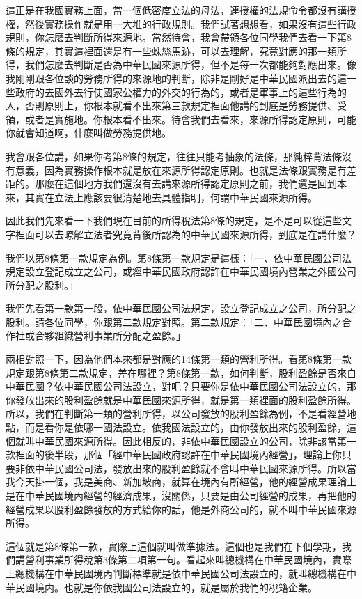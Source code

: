 \documentclass[]{ctexbook}
\begin{document}
這正是在我國實務上面，當一個低密度立法的母法，連授權的法規命令都沒有講授權，然後實務操作就是用一大堆的行政規則。我們試著想想看，如果沒有這些行政規則，你怎麼去判斷所得來源地。當然待會，我會帶領各位同學我們去看一下第8條的規定，其實這裡面還是有一些蛛絲馬跡，可以去理解，究竟對應的那一類所得，我們怎麼去判斷是否為中華民國來源所得，但不是每一次都能夠對應出來。像我剛剛跟各位談的勞務所得的來源地的判斷，除非是剛好是中華民國派出去的這一些政府的去國外去行使國家公權力的外交的行為的，或者是軍事上的這些行為的人，否則原則上，你根本就看不出來第三款規定裡面他講的到底是勞務提供、受領，或者是實施地。你根本看不出來。待會我們去看來，來源所得認定原則，可能你就會知道啊，什麼叫做勞務提供地。

我會跟各位講，如果你考第8條的規定，往往只能考抽象的法條，那純粹背法條沒有意義，因為實務操作根本就是放在來源所得認定原則。也就是法條跟實務是有差距的。那麼在這個地方我們還沒有去講來源所得認定原則之前，我們還是回到本來，其實在立法上應該要很清楚地去具體指明，何謂中華民國來源所得。

因此我們先來看一下我們現在目前的所得稅法第8條的規定，是不是可以從這些文字裡面可以去瞭解立法者究竟背後所認為的中華民國來源所得，到底是在講什麼？

我們以第8條第一款規定為例。第8條第一款規定是這樣：「一、依中華民國公司法規定設立登記成立之公司，或經中華民國政府認許在中華民國境內營業之外國公司所分配之股利。」

我們先看第一款第一段，依中華民國公司法規定，設立登記成立之公司，所分配之股利。請各位同學，你跟第二款規定對照。第二款規定：「二、中華民國境內之合作社或合夥組織營利事業所分配之盈餘。」

兩相對照一下，因為他們本來都是對應的14條第一類的營利所得。看第8條第一款規定跟第8條第二款規定，差在哪裡？第8條第一款，如何判斷，股利盈餘是否來自中華民國？依中華民國公司法設立，對吧？只要你是依中華民國公司法設立的，那你發放出來的股利盈餘就是中華民國來源所得，就是第一類裡面的股利盈餘所得。所以，我們在判斷第一類的營利所得，以公司發放的股利盈餘為例，不是看經營地點，而是看你是依哪一國法設立。依我國法設立的，由你發放出來的股利盈餘，這個就叫中華民國來源所得。因此相反的，非依中華民國設立的公司，除非該當第一款裡面的後半段，那個「經中華民國政府認許在中華民國境內經營」，理論上你只要非依中華民國公司法，發放出來的股利盈餘就不會叫中華民國來源所得。所以當我今天掛一個，我是美商、新加坡商，就算在境內有所經營，他的經營成果理論上是在中華民國境內經營的經濟成果，沒關係，只要是由公司經營的成果，再把他的經營成果以股利盈餘發放的方式給你的話，他是外商公司的，就不叫中華民國來源所得。

這個就是第8條第一款，實際上這個就叫做準據法。這個也是我們在下個學期，我們講營利事業所得稅第3條第二項第一句。看起來叫總機構在中華民國境內，實際上總機構在中華民國境內判斷標準就是依中華民國公司法設立的，就叫總機構在中華民國境内。也就是你依我國公司法設立的，就是屬於我們的稅籍企業。
\end{document}
